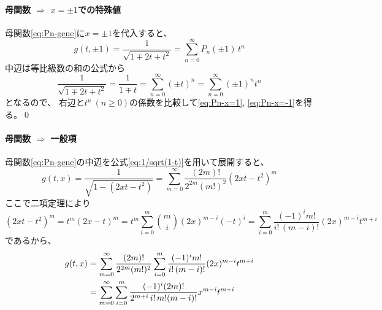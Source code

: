 \documentclass[../main/main]{subfiles}
\begin{document}
\vspace{10pt}
\paragraph{母関数 $\Longrightarrow$ $x=\pm 1$での特殊値}
母関数\eqref{eq:Pn-gene}に$x=\pm 1$を代入すると、
\begin{equation}
  g(t, \pm 1) = \frac{1}{\sqrt{1\mp 2t+t^2}} 
		= \sum_{n=0}^\infty P_n(\pm 1) \, t^n
\end{equation}
中辺は等比級数の和の公式から
\begin{equation*}
  \frac{1}{\sqrt{1\mp 2t+t^2}} 
	= \frac{1}{1\mp t}
	= \sum_{n=0}^\infty (\pm t)^n
	= \sum_{n=0}^\infty (\pm 1)^n t^n
\end{equation*}
となるので、
右辺と$t^n \ (n \geq 0)$の係数を比較して\eqref{eq:Pn-x=1}, \eqref{eq:Pn-x=-1}を得る。\qed

\vspace{10pt}
\paragraph{母関数 $\Longrightarrow$ 一般項}
母関数\eqref{eq:Pn-gene}の中辺を公式\eqref{eq:1/sqrt(1-t)}を用いて展開すると、
\begin{equation*}
  g(t, x)
	= \frac{1}{\sqrt{1-(2xt-t^2)}} 
	= \sum_{m=0}^\infty \frac{(2m)!}{2^{2m} (m!)^2} (2xt-t^2)^m
\end{equation*}
ここで二項定理により
\begin{equation*}
  (2xt-t^2)^m = t^m (2x-t)^m
	= t^m \sum_{i=0}^m \binom{m}{i} (2x)^{m-i} (-t)^i 
	= \sum_{i=0}^m \frac{(-1)^i m!}{i! \, (m-i)!} (2x)^{m-i} t^{m+i}
\end{equation*}
であるから、
\begin{align}
  g(t, x)
	&= \sum_{m=0}^\infty \frac{(2m)!}{2^{2m} (m!)^2} 
		\sum_{i=0}^m \frac{(-1)^i m!}{i! \, (m-i)!} (2x)^{m-i} t^{m+i} \notag\\
	&= \sum_{m=0}^\infty \sum_{i=0}^m \frac{(-1)^i (2m)!}{2^{m+i} \, i! \, m! (m-i)!} x^{m-i} t^{m+i}
		\label{eq:Pn-gene->ippan}
\end{align}
\end{document}
